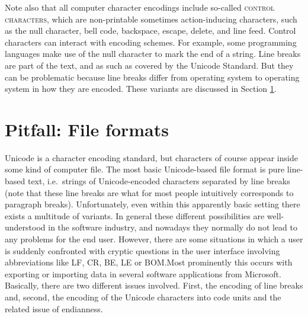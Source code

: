 Note also that all computer character encodings include so-called \textsc{control characters}, which are non-printable sometimes action-inducing characters, such as the null character, bell code, backspace, escape, delete, and line feed. Control characters can interact with encoding schemes. For example, some programming languages make use of the null character to mark the end of a string. Line breaks are part of the text, and as such as covered by the Unicode Standard. But they can be problematic because line breaks differ from operating system to operating system in how they are encoded. These variants are discussed in Section \ref{pitfall-file-formats}.



\section{Pitfall: File formats}
\label{pitfall-file-formats}

Unicode is a character encoding standard, but characters of course 
appear inside some kind of computer file. The most basic Unicode-based file
format is pure line-based text, i.e.~strings of Unicode-encoded characters
separated by line breaks (note that these line breaks are what for most people
intuitively corresponds to paragraph breaks). Unfortunately, even within this
apparently basic setting there exists a multitude of variants. In general these
different possibilities are well-understood in the software industry, and
nowadays they normally do not lead to any problems for the end user. However,
there are some situations in which a user is suddenly confronted with cryptic
questions in the user interface involving abbreviations like LF, CR, BE, LE or
BOM.\@ Most prominently this occurs with exporting or importing data in several
software applications from Microsoft. Basically, there are two different issues
involved. First, the encoding of line breaks and, second, the encoding of the
Unicode characters into code units and the related issue of endianness.

